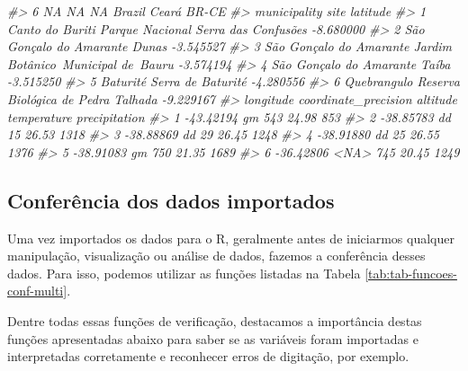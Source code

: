 \documentclass[
]{book}
\newenvironment{Shaded}{\begin{snugshade}}{\end{snugshade}}
\newcommand{\CommentTok}[1]{\textcolor[rgb]{0.37,0.37,0.37}{\textit{#1}}}
\begin{document}
\begin{Shaded}
\begin{Highlighting}[]
\CommentTok{\#\textgreater{} 6           NA          NA            NA  Brazil Ceará              BR{-}CE}
\CommentTok{\#\textgreater{}              municipality                                site  latitude}
\CommentTok{\#\textgreater{} 1         Canto do Buriti Parque Nacional Serra das Confusões {-}8.680000}
\CommentTok{\#\textgreater{} 2 São Gonçalo do Amarante                               Dunas {-}3.545527}
\CommentTok{\#\textgreater{} 3 São Gonçalo do Amarante  Jardim Botânico Municipal de Bauru {-}3.574194}
\CommentTok{\#\textgreater{} 4 São Gonçalo do Amarante                               Taíba {-}3.515250}
\CommentTok{\#\textgreater{} 5                Baturité                   Serra de Baturité {-}4.280556}
\CommentTok{\#\textgreater{} 6             Quebrangulo  Reserva Biológica de Pedra Talhada {-}9.229167}
\CommentTok{\#\textgreater{}   longitude coordinate\_precision altitude temperature precipitation}
\CommentTok{\#\textgreater{} 1 {-}43.42194                   gm      543       24.98           853}
\CommentTok{\#\textgreater{} 2 {-}38.85783                   dd       15       26.53          1318}
\CommentTok{\#\textgreater{} 3 {-}38.88869                   dd       29       26.45          1248}
\CommentTok{\#\textgreater{} 4 {-}38.91880                   dd       25       26.55          1376}
\CommentTok{\#\textgreater{} 5 {-}38.91083                   gm      750       21.35          1689}
\CommentTok{\#\textgreater{} 6 {-}36.42806                 \textless{}NA\textgreater{}      745       20.45          1249}
\end{Highlighting}
\end{Shaded}

\hypertarget{conferuxeancia-dos-dados-importados}{%
\subsection{Conferência dos dados importados}\label{conferuxeancia-dos-dados-importados}}

Uma vez importados os dados para o R, geralmente antes de iniciarmos qualquer manipulação, visualização ou análise de dados, fazemos a conferência desses dados. Para isso, podemos utilizar as funções listadas na Tabela \ref{tab:tab-funcoes-conf-multi}.

Dentre todas essas funções de verificação, destacamos a importância destas funções apresentadas abaixo para saber se as variáveis foram importadas e interpretadas corretamente e reconhecer erros de digitação, por exemplo.
\end{document}
